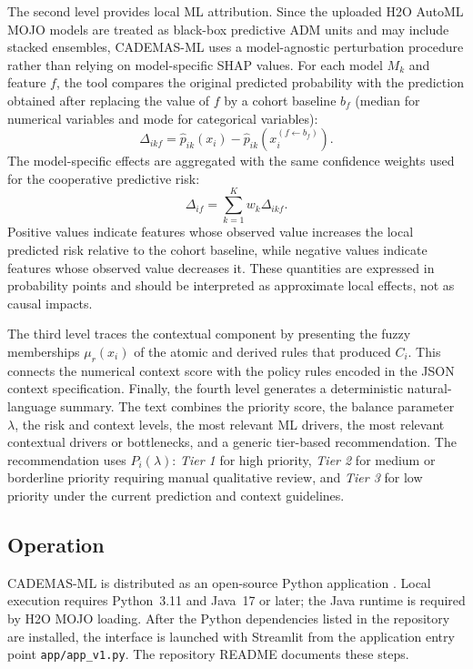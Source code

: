 \documentclass{interact}
\begin{document}
The second level provides local ML attribution. Since the uploaded H2O AutoML MOJO models are treated as black-box predictive ADM units and may include stacked ensembles, CADEMAS-ML uses a model-agnostic perturbation procedure rather than relying on model-specific SHAP values. For each model $M_k$ and feature $f$, the tool compares the original predicted probability with the prediction obtained after replacing the value of $f$ by a cohort baseline $b_f$ (median for numerical variables and mode for categorical variables):
\begin{equation}
\Delta_{ikf}=\hat{p}_{ik}(x_i)-\hat{p}_{ik}(x_i^{(f \leftarrow b_f)}).
\label{eq:local_attribution_model}
\end{equation}
The model-specific effects are aggregated with the same confidence weights used for the cooperative predictive risk:
\begin{equation}
\Delta_{if}=\sum_{k=1}^{K} w_k \Delta_{ikf}.
\label{eq:local_attribution_global}
\end{equation}
Positive values indicate features whose observed value increases the local predicted risk relative to the cohort baseline, while negative values indicate features whose observed value decreases it. These quantities are expressed in probability points and should be interpreted as approximate local effects, not as causal impacts.

The third level traces the contextual component by presenting the fuzzy memberships $\mu_r(x_i)$ of the atomic and derived rules that produced $C_i$. This connects the numerical context score with the policy rules encoded in the JSON context specification. Finally, the fourth level generates a deterministic natural-language summary. The text combines the priority score, the balance parameter $\lambda$, the risk and context levels, the most relevant ML drivers, the most relevant contextual drivers or bottlenecks, and a generic tier-based recommendation. The recommendation uses $P_i(\lambda)$: \textit{Tier 1} for high priority, \textit{Tier 2} for medium or borderline priority requiring manual qualitative review, and \textit{Tier 3} for low priority under the current prediction and context guidelines.

\subsection{Operation}\label{sec:operation}

CADEMAS-ML is distributed as an open-source Python application \citep{cademasml2026}. Local execution requires Python~3.11 and Java~17 or later; the Java runtime is required by H2O MOJO loading. After the Python dependencies listed in the repository are installed, the interface is launched with Streamlit from the application entry point \texttt{app/app\_v1.py}. The repository README documents these steps.
\end{document}
